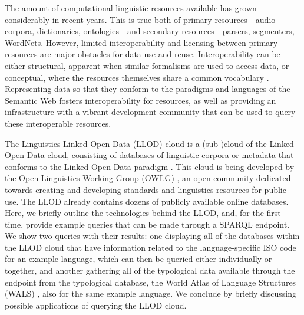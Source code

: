 %
%


The amount of computational linguistic resources available has grown considerably in recent years. 
This is true both of primary resources - audio corpora, dictionaries, ontologies - and secondary resources - parsers, segmenters, WordNets. However, limited interoperability and licensing between primary resources are major obstacles for data use and reuse. Interoperability can be either structural, apparent when similar formalisms are used to access data, or conceptual, where the resources themselves share a common vocabulary \citep{ide-pustejovsky2010-interoperability}. Representing data so that they conform to the paradigms and languages of the Semantic Web fosters interoperability for resources, as well as providing an infrastructure with a vibrant development community that can be used to query these interoperable resources. 

The Linguistics Linked Open Data (LLOD) cloud is a (sub-)cloud of the Linked Open Data cloud, consisting of databases of linguistic corpora or metadata that conforms to the Linked Open Data paradigm \citep{bernersLee2006_linkeddata}. This cloud is being developed by the Open Linguistics Working Group (OWLG) \cite{owlg4lrec}, an open community dedicated towards creating and developing standards and linguistics resources for public use. The LLOD already contains dozens of publicly available online databases. Here, we briefly outline the technologies behind the LLOD, and, for the first time, provide example queries that can be made through a SPARQL endpoint. We show two queries with their results: one displaying all of the databases within the LLOD cloud that have information related to the language-specific ISO code for an example language, which can then be queried either individually or together, and another gathering all of the typological data available through the endpoint from the typological database, the World Atlas of Language Structures (WALS) \citep{Haspelmath_etal2008}, also for the same example language. We conclude by briefly discussing possible applications of querying the LLOD cloud. 
